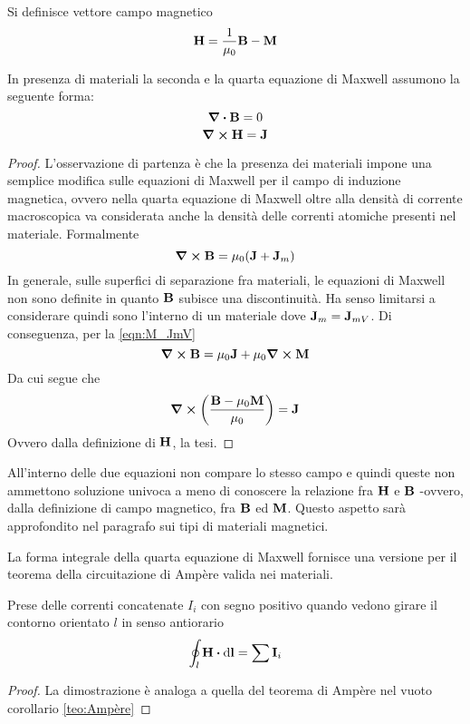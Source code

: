 \begin{defn}
    Si definisce vettore campo magnetico
    \[
        \vb{H}=\frac{1}{\mu_0}\vb{B}-\vb{M}
    \]
\end{defn}

\begin{thm}
    In presenza di materiali la seconda e la quarta equazione di Maxwell assumono la seguente forma:
    \begin{equation}
        \div{\vb{B}}=0
    \end{equation}
    \begin{equation}
        \curl{\vb{H}}=\vb{J}
    \end{equation}
\end{thm}
\begin{proof}
    L'osservazione di partenza è che la presenza dei materiali impone una semplice modifica sulle
    equazioni di Maxwell per il campo di induzione magnetica, ovvero nella quarta equazione di Maxwell
    oltre alla densità di corrente macroscopica va considerata anche la densità delle correnti atomiche
    presenti nel materiale. Formalmente
    \[
        \curl{\vb{B}}=\mu_0(\vb{J}+\vb{J}_m)
    \]
    In generale, sulle superfici di separazione fra materiali, le equazioni di Maxwell non sono definite
    in quanto $\vb{B}$ subisce una discontinuità. Ha senso limitarsi a considerare quindi sono l'interno
    di un materiale dove $\vb{J}_m=\vb{J}_{mV}$. Di conseguenza, per la \ref{eqn:M_JmV}
    \[
        \curl{\vb{B}}=\mu_0 \vb{J}+ \mu_0\curl{\vb{M}}
    \]
    Da cui segue che
    \[
        \curl(\frac{\vb{B}-\mu_0\vb{M}}{\mu_0})=\vb{J}
    \]
    Ovvero dalla definizione di $\vb{H}$, la tesi.
\end{proof}
All'interno delle due equazioni non compare lo stesso campo e quindi queste non ammettono soluzione univoca a meno di
conoscere la relazione fra $\vb{H}$ e $\vb{B}$ -ovvero, dalla definizione di campo magnetico, fra $\vb{B}$ ed $\vb{M}$.
Questo aspetto sarà approfondito nel paragrafo sui tipi di materiali magnetici.

La forma integrale della quarta equazione di Maxwell fornisce una versione per il teorema della circuitazione di
Ampère valida nei materiali.
\begin{cor}
    Prese delle correnti
    concatenate $I_i$ con segno positivo quando vedono girare il contorno orientato $l$
    in senso antiorario
    \begin{equation}
        \oint_l\vb{H}\vdot\dd{\vb{l}}=\sum \vb{I}_i
    \end{equation}
\end{cor}
\begin{proof}
    La dimostrazione è analoga a quella del teorema di Ampère nel vuoto corollario \ref{teo:Ampère}
\end{proof}


